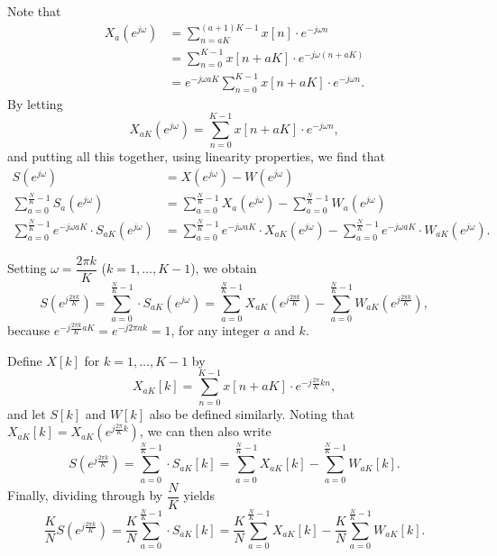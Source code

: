 \documentclass{article}[a4paper]
\begin{document}
	Note that
	\begin{align*}
		X_a\left(e^{j\omega}\right)
		&=	\sum_{n=aK}^{(a+1)K-1} x[n] \cdot e^{-j\omega n} \\
		&=	\sum_{n=0}^{K-1} x[n + aK] \cdot e^{-j\omega (n + aK)} \\
		&=	e^{-j\omega aK} \sum_{n=0}^{K-1} x[n + aK] \cdot e^{-j\omega n}.
	\end{align*}
	By letting \[
		X_{aK} \left(e^{j\omega}\right) = \sum_{n=0}^{K-1} x[n + aK] \cdot e^{-j\omega n},
	\] and putting all this together, using linearity properties, we find that
	\begin{align*}
		S\left(e^{j\omega}\right)
		&=	X\left(e^{j\omega}\right) - W\left(e^{j\omega}\right) \\
		\sum_{a=0}^{\frac{N}{K}-1} S_a\left(e^{j\omega}\right)
		&=	\sum_{a=0}^{\frac{N}{K}-1} X_a\left(e^{j\omega}\right)
			-
			\sum_{a=0}^{\frac{N}{K}-1} W_a\left(e^{j\omega}\right) \\
		\sum_{a=0}^{\frac{N}{K}-1} e^{-j\omega aK} \cdot S_{aK} \left(e^{j\omega}\right)
		&=	\sum_{a=0}^{\frac{N}{K}-1} e^{-j\omega aK} \cdot X_{aK} \left(e^{j\omega}\right)
			-
			\sum_{a=0}^{\frac{N}{K}-1} e^{-j\omega aK} \cdot W_{aK} \left(e^{j\omega}\right).
	\end{align*}
	
	Setting $\omega = \dfrac{2\pi k}{K}$ ($k = 1, \dots, K-1$), we obtain \[
		S\left(e^{j\frac{2\pi k}{K}}\right)
		=
		\sum_{a=0}^{\frac{N}{K}-1} \cdot S_{aK} \left(e^{j\omega}\right)
		=
		\sum_{a=0}^{\frac{N}{K}-1} X_{aK} \left(e^{j\frac{2\pi k}{K}}\right)
		-
		\sum_{a=0}^{\frac{N}{K}-1} W_{aK} \left(e^{j\frac{2\pi k}{K}}\right),
	\] because $e^{-j\frac{2\pi k}{K} aK} = e^{-j 2\pi ak} = 1$, for any integer $a$ and $k$.
	
	Define $X[k]$ for $k=1,\dots,K-1$ by \[
		X_{aK}[k] = \sum_{n=0}^{K-1} x[n + aK] \cdot e^{-j\frac{2\pi}{K} kn},
	\] and let $S[k]$ and $W[k]$ also be defined similarly. Noting that $X_{aK}[k] = X_{aK} \left(e^{j\frac{2\pi}{K} k}\right)$, we can then also write \[
		S\left(e^{j\frac{2\pi k}{K}}\right)
		=
		\sum_{a=0}^{\frac{N}{K}-1} \cdot S_{aK} [k]
		=
		\sum_{a=0}^{\frac{N}{K}-1} X_{aK} [k]
		-
		\sum_{a=0}^{\frac{N}{K}-1} W_{aK} [k].
	\] Finally, dividing through by $\dfrac{N}{K}$ yields \[
		\dfrac{K}{N} S\left(e^{j\frac{2\pi k}{K}}\right)
		=
		\dfrac{K}{N} \sum_{a=0}^{\frac{N}{K}-1} \cdot S_{aK} [k]
		=
		\dfrac{K}{N} \sum_{a=0}^{\frac{N}{K}-1} X_{aK} [k]
		-
		\dfrac{K}{N} \sum_{a=0}^{\frac{N}{K}-1} W_{aK} [k].
	\]
	
\end{document}
